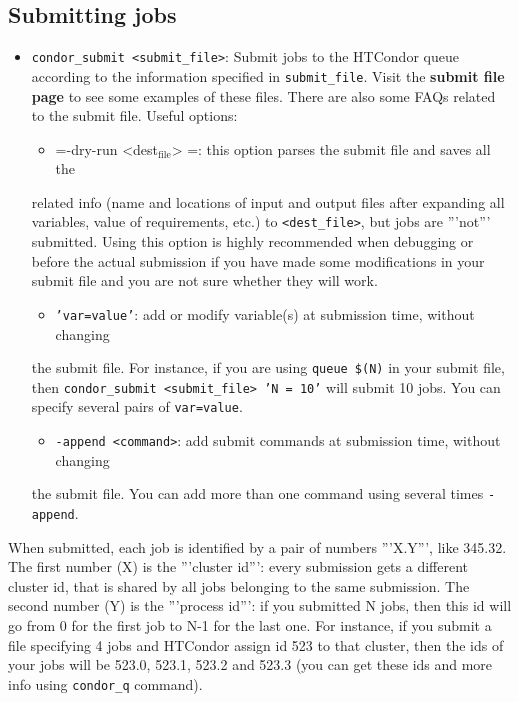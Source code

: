 \documentclass[a4paper,10pt]{article}
\begin{document}
\subsection{Submitting jobs}
\label{sec:org5faa532}

\begin{itemize}
\item \texttt{condor\_submit <submit\_file>}: Submit jobs to the HTCondor queue according to
the information specified in \texttt{submit\_file}. Visit the \textbf{submit file page} to
see some examples of these files. There are also some FAQs related to the
submit file. Useful options:

\begin{itemize}
\item =-dry-run <dest\(_{\text{file}}\)> =: this option parses the submit file and saves all the
\end{itemize}
related info (name and locations of input and output files after expanding all
variables, value of requirements, etc.) to \texttt{<dest\_file>}, but jobs are '''not'''
submitted. Using this option is highly recommended when debugging or before the
actual submission if you have made some modifications in your submit file and
you are not sure whether they will work.

\begin{itemize}
\item \texttt{'var=value'}: add or modify variable(s) at submission time, without changing
\end{itemize}
the submit file. For instance, if you are using \texttt{queue \$(N)} in your submit
file, then \texttt{condor\_submit <submit\_file> 'N = 10'} will submit 10 jobs. You can
specify several pairs of \texttt{var=value}.

\begin{itemize}
\item \texttt{-append <command>}: add submit commands at submission time, without changing
\end{itemize}
the submit file. You can add more than one command using several times
\texttt{-append}.
\end{itemize}

When submitted, each job is identified by a pair of numbers '''X.Y''', like
345.32. The first number (X) is the '''cluster id''': every submission gets a
different cluster id, that is shared by all jobs belonging to the same
submission. The second number (Y) is the '''process id''': if you submitted N
jobs, then this id will go from 0 for the first job to N-1 for the last one. For
instance, if you submit a file specifying 4 jobs and HTCondor assign id 523 to
that cluster, then the ids of your jobs will be 523.0, 523.1, 523.2 and 523.3
(you can get these ids and more info using \texttt{condor\_q} command).
\end{document}
